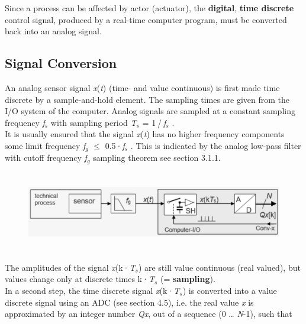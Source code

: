 Since a process can be affected by actor (actuator), the \textbf{digital}, \textbf{time discrete} control signal, produced by a real-time computer program, must be converted back into an analog signal.\\

\subsection{Signal Conversion}

An analog sensor signal \textit{x}(\textit{t}) (time- and value continuous) is first made time discrete by a sample-and-hold element. The sampling times are given from the I/O system of the computer. Analog signals are sampled at a constant sampling frequency \textit{f${}_{s}$} with sampling period \textit{T${}_{s}$} = 1${}_{\ }$/${}_{\ }$\textit{f${}_{s}$} .\\

It is usually ensured that the signal \textit{x}(\textit{t}) has no higher frequency components some limit frequency \textit{f${}_{g}$} $\mathrm{\le}$ 0.5·\textit{f${}_{s}$} . This is indicated by the analog low-pass filter with cutoff frequency \textit{f${}_{g}$}  sampling theorem see section 3.1.1.\\

    \begin{figure}[h]
    \centering
    \includegraphics[width=14cm, height=3.5cm]{Images/image137.png}
    \label{fig:Fig }
    \end{figure}

The amplitudes of the signal \textit{x}(k·\textit{T${}_{s}$}) are still value continuous (real valued), but values change only at discrete times k·\textit{T${}_{s}$} (= \textbf{sampling}).\\

In a second step, the time discrete signal \textit{x}(k·\textit{T${}_{s}$}) is converted into a value discrete signal using an ADC (see section 4.5), i.e. the real value \textit{x} is approximated by an integer number \textit{Qx}, out of a sequence (0 {\dots} \textit{N}-1), such that \\

